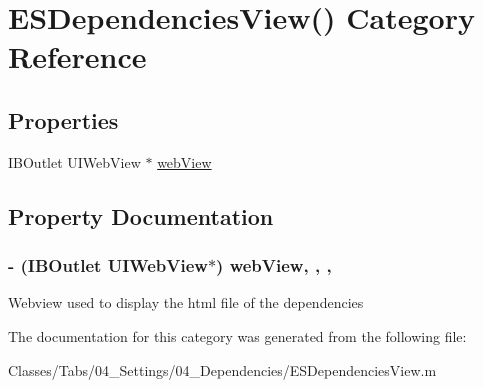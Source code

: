 \hypertarget{category_e_s_dependencies_view_07_08}{}\section{E\+S\+Dependencies\+View() Category Reference}
\label{category_e_s_dependencies_view_07_08}
\subsection*{Properties}
\begin{DoxyCompactItemize}
\item 
I\+B\+Outlet U\+I\+Web\+View $\ast$ \hyperlink{category_e_s_dependencies_view_07_08_a43577abf8de1a2e78445a67c416f83b7}{web\+View}
\end{DoxyCompactItemize}


\subsection{Property Documentation}
\hypertarget{category_e_s_dependencies_view_07_08_a43577abf8de1a2e78445a67c416f83b7}{}
\subsubsection[{web\+View}]{\setlength{\rightskip}{0pt plus 5cm}-\/ (I\+B\+Outlet U\+I\+Web\+View$\ast$) web\+View\hspace{0.3cm}{\ttfamily [read]}, {\ttfamily [write]}, {\ttfamily [nonatomic]}, {\ttfamily [strong]}}\label{category_e_s_dependencies_view_07_08_a43577abf8de1a2e78445a67c416f83b7}
Webview used to display the html file of the dependencies 

The documentation for this category was generated from the following file\+:\begin{DoxyCompactItemize}
\item 
Classes/\+Tabs/04\+\_\+\+Settings/04\+\_\+\+Dependencies/E\+S\+Dependencies\+View.\+m\end{DoxyCompactItemize}
